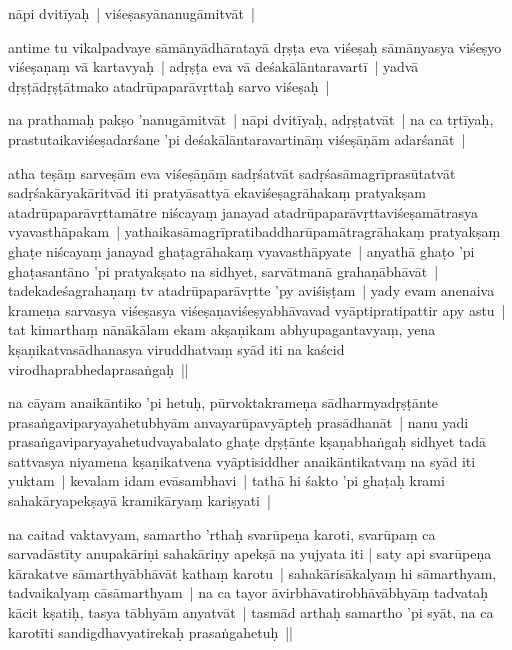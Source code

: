 \documentclass[article,a4paper]{memoir}
\begin{document}
	  \pstart nā\-pi dvitī\-yaḥ | viśeṣasyā\-nanugā\-mitvā\-t |
	\pend
      

	  \pstart antime tu vikalpadvaye sā\-mā\-nyā\-dhā\-ratayā\- dṛṣṭa eva viśeṣaḥ sā\-mā\-nyasya viśeṣyo viśeṣaṇaṃ vā\- kartavyaḥ | adṛṣṭa eva vā\- deśakā\-lā\-ntaravartī\- | yadvā\- dṛṣṭā\-dṛṣṭā\-tmako atadrū\-paparā\-vṛttaḥ sarvo viśeṣaḥ | 
	\pend
      

	  \pstart na prathamaḥ pakṣo 'nanugā\-mitvā\-t | nā\-pi dvitī\-yaḥ, adṛṣṭatvā\-t | na ca tṛtī\-yaḥ, prastutaikaviśeṣadarśane 'pi deśakā\-lā\-ntaravartinā\-ṃ viśeṣā\-ṇā\-m adarśanā\-t |
	\pend
      

	  \pstart atha teṣā\-ṃ sarveṣā\-m eva viśeṣā\-ṇā\-ṃ sadṛśatvā\-t sadṛśasā\-magrī\-prasū\-tatvā\-t sadṛśakā\-ryakā\-ritvā\-d iti pratyā\-sattyā\- ekaviśeṣagrā\-hakaṃ pratyakṣam atadrū\-paparā\-vṛttamā\-tre niścayaṃ janayad atadrū\-paparā\-vṛttaviśeṣamā\-trasya vyavasthā\-pakam | \label{thakur75-74.9} yathaikasā\-magrī\-pratibaddharū\-pamā\-tragrā\-hakaṃ pratyakṣaṃ ghaṭe niścayaṃ janayad ghaṭagrā\-hakaṃ vyavasthā\-pyate | anyathā\- ghaṭo 'pi ghaṭasantā\-no 'pi pratyakṣato na sidhyet, sarvā\-tmanā\- grahaṇā\-bhā\-vā\-t | \label{thakur75-74.12} tadekadeśagrahaṇaṃ tv atadrū\-paparā\-vṛtte 'py aviśiṣṭam | yady evam anenaiva krameṇa sarvasya viśeṣasya viśeṣaṇaviśeṣyabhā\-vavad vyā\-ptipratipattir apy astu | \label{thakur75-74.13} tat kimarthaṃ nā\-nā\-kā\-lam ekam akṣaṇikam abhyupagantavyaṃ, yena kṣaṇikatvasā\-dhanasya viruddhatvaṃ syā\-d iti na kaścid virodhaprabhedaprasaṅgaḥ ||
	\pend
      

	  \pstart na cā\-yam anaikā\-ntiko 'pi hetuḥ, pū\-rvoktakrameṇa sā\-dharmyadṛṣṭā\-nte prasaṅgaviparyayahetubhyā\-m anvayarū\-pavyā\-pteḥ prasā\-dhanā\-t | \label{thakur75-74.17} nanu yadi prasaṅgaviparyayahetudvayabalato ghaṭe dṛṣṭā\-nte kṣaṇabhaṅgaḥ sidhyet tadā\- sattvasya niyamena kṣaṇikatvena vyā\-ptisiddher anaikā\-ntikatvaṃ na syā\-d iti yuktam | kevalam idam evā\-sambhavi | tathā\- hi śakto 'pi ghaṭaḥ krami sahakā\-ryapekṣayā\- kramikā\-ryaṃ kariṣyati |
	\pend
      

	  \pstart na caitad vaktavyam, samartho 'rthaḥ svarū\-peṇa karoti, svarū\-paṃ ca sarvadā\-stī\-ty anupakā\-riṇi sahakā\-riṇy apekṣā\- na yujyata iti | saty api svarū\-peṇa kā\-rakatve sā\-marthyā\-bhā\-vā\-t kathaṃ karotu | sahakā\-risā\-kalyaṃ hi sā\-marthyam, tadvaikalyaṃ cā\-sā\-marthyam | na ca tayor ā\-virbhā\-vatirobhā\-vā\-bhyā\-ṃ tadvataḥ kā\-cit kṣatiḥ, tasya tā\-bhyā\-m anyatvā\-t | tasmā\-d arthaḥ samartho 'pi syā\-t, na ca karotī\-ti sandigdhavyatirekaḥ prasaṅgahetuḥ ||
	\pend
      
\end{document}
